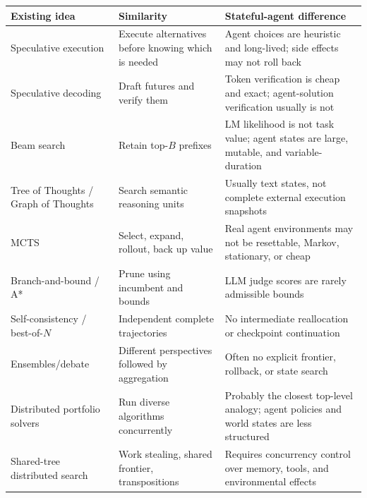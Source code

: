\documentclass[
  letterpaper,
]{article}
\newcounter{none} %
\begin{document}
{\def\LTcaptype{none} %
\begin{longtable}[]{@{}
  >{\raggedright\arraybackslash}p{}
  >{\raggedright\arraybackslash}p{}
  >{\raggedright\arraybackslash}p{}@{}}
\toprule\noalign{}
\begin{minipage}[b]{\linewidth}\raggedright
Existing idea
\end{minipage} & \begin{minipage}[b]{\linewidth}\raggedright
Similarity
\end{minipage} & \begin{minipage}[b]{\linewidth}\raggedright
Stateful-agent difference
\end{minipage} \\
\midrule\noalign{}
\endhead
\bottomrule\noalign{}
\endlastfoot
Speculative execution & Execute alternatives before knowing which is needed & Agent choices are heuristic and long-lived; side effects may not roll back \\
Speculative decoding & Draft futures and verify them & Token verification is cheap and exact; agent-solution verification usually is not \\
Beam search & Retain top-\(B\) prefixes & LM likelihood is not task value; agent states are large, mutable, and variable-duration \\
Tree of Thoughts / Graph of Thoughts & Search semantic reasoning units & Usually text states, not complete external execution snapshots \\
MCTS & Select, expand, rollout, back up value & Real agent environments may not be resettable, Markov, stationary, or cheap \\
Branch-and-bound / A* & Prune using incumbent and bounds & LLM judge scores are rarely admissible bounds \\
Self-consistency / best-of-\(N\) & Independent complete trajectories & No intermediate reallocation or checkpoint continuation \\
Ensembles/debate & Different perspectives followed by aggregation & Often no explicit frontier, rollback, or state search \\
Distributed portfolio solvers & Run diverse algorithms concurrently & Probably the closest top-level analogy; agent policies and world states are less structured \\
Shared-tree distributed search & Work stealing, shared frontier, transpositions & Requires concurrency control over memory, tools, and environmental effects \\
\end{longtable}
}
\end{document}
